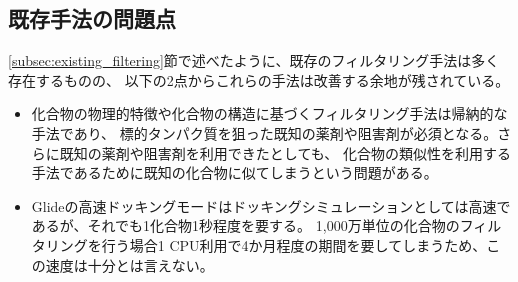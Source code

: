 \subsection{既存手法の問題点}
\ref{subsec:existing_filtering}節で述べたように、既存のフィルタリング手法は多く存在するものの、
以下の2点からこれらの手法は改善する余地が残されている。
\begin{itemize}
\item 化合物の物理的特徴や化合物の構造に基づくフィルタリング手法は帰納的な手法であり、
	標的タンパク質を狙った既知の薬剤や阻害剤が必須となる。さらに既知の薬剤や阻害剤を利用できたとしても、
	化合物の類似性を利用する手法であるために既知の化合物に似てしまうという問題がある。	
\item Glideの高速ドッキングモードはドッキングシミュレーションとしては高速であるが、それでも1化合物1秒程度を要する。
	1,000万単位の化合物のフィルタリングを行う場合1 CPU利用で4か月程度の期間を要してしまうため、この速度は十分とは言えない。
\end{itemize}
